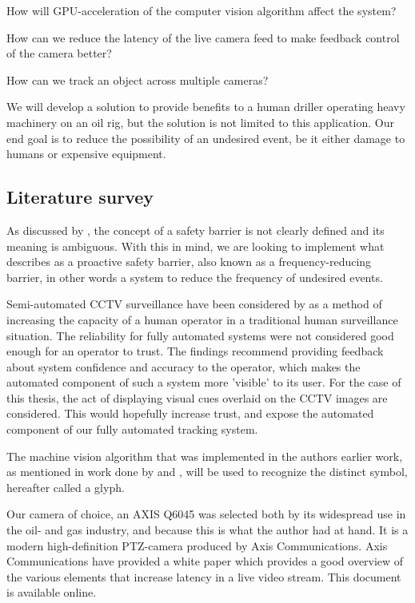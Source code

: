 How will GPU-acceleration of the computer vision algorithm affect the system?

How can we reduce the latency of the live camera feed to make feedback control of the camera better?

How can we track an object across multiple cameras?

We will develop a solution to provide benefits to a human driller operating heavy machinery on an oil rig, but the solution is not limited to this application. Our end goal is to reduce the possibility of an undesired event, be it either damage to humans or expensive equipment.

\subsection{Literature survey}
As discussed by \citet{sklet05}, the concept of a safety barrier is not clearly defined and its meaning is ambiguous. With this in mind, we are looking to implement what \citet{rausand14} describes as a proactive safety barrier, also known as a frequency-reducing barrier, in other words a system to reduce the frequency of undesired events.

Semi-automated CCTV surveillance have been considered by \citet{dadashi12} as a method of increasing the capacity of a human operator in a traditional human surveillance situation. The reliability for fully automated systems were not considered good enough for an operator to trust. The findings recommend providing feedback about system confidence and accuracy to the operator, which makes the automated component of such a system more 'visible' to its user. For the case of this thesis, the act of displaying visual cues overlaid on the CCTV images are considered. This would hopefully increase trust, and expose the automated component of our fully automated tracking system.

The machine vision algorithm that was implemented in the authors earlier work, as mentioned in work done by \citet{boyers13} and \citet{kirillov10}, will be used to recognize the distinct symbol, hereafter called a glyph.

Our camera of choice, an AXIS Q6045 was selected both by its widespread use in the oil- and gas industry, and because this is what the author had at hand. It is a modern high-definition PTZ-camera produced by Axis Communications.  Axis Communications have provided a white paper which provides a good overview of the various elements that increase latency in a live video stream. This document is available online. \citep{axis15}

